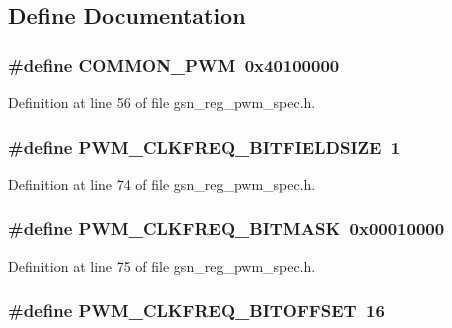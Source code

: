 \subsection{Define Documentation}
\hypertarget{a00565_a8a4ca7fd926356de47ba79c81559f1fc}{
\subsubsection[{COMMON\_\-PWM}]{\setlength{\rightskip}{0pt plus 5cm}\#define COMMON\_\-PWM~0x40100000}}
\label{a00565_a8a4ca7fd926356de47ba79c81559f1fc}


Definition at line 56 of file gsn\_\-reg\_\-pwm\_\-spec.h.

\hypertarget{a00565_a3e40fa7bb96ef0ab41dd6c55a677fd4e}{
\subsubsection[{PWM\_\-CLKFREQ\_\-BITFIELDSIZE}]{\setlength{\rightskip}{0pt plus 5cm}\#define PWM\_\-CLKFREQ\_\-BITFIELDSIZE~1}}
\label{a00565_a3e40fa7bb96ef0ab41dd6c55a677fd4e}


Definition at line 74 of file gsn\_\-reg\_\-pwm\_\-spec.h.

\hypertarget{a00565_aafb0f88c898bc809c1dedcb764035cdf}{
\subsubsection[{PWM\_\-CLKFREQ\_\-BITMASK}]{\setlength{\rightskip}{0pt plus 5cm}\#define PWM\_\-CLKFREQ\_\-BITMASK~0x00010000}}
\label{a00565_aafb0f88c898bc809c1dedcb764035cdf}


Definition at line 75 of file gsn\_\-reg\_\-pwm\_\-spec.h.

\hypertarget{a00565_a5ab3f3c7f2fde6281cf23a776170bde8}{
\subsubsection[{PWM\_\-CLKFREQ\_\-BITOFFSET}]{\setlength{\rightskip}{0pt plus 5cm}\#define PWM\_\-CLKFREQ\_\-BITOFFSET~16}}
\label{a00565_a5ab3f3c7f2fde6281cf23a776170bde8}



